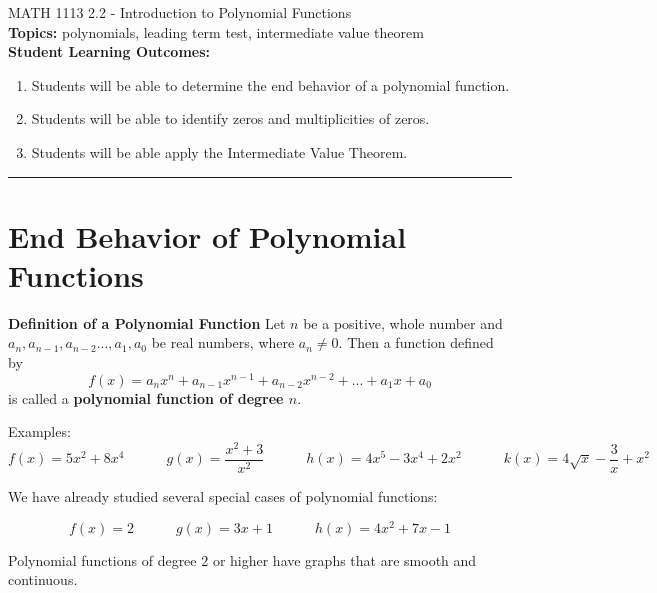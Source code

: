 \documentclass[11pt]{article}
\newcommand{\boxcolor}{gray!30}
\newenvironment{boxthm}{\begin{mdframed}[backgroundcolor=\boxcolor,nobreak=true]}{\end{mdframed}}
\begin{document}
\noindent MATH 1113   \hfill 2.2 - Introduction to Polynomial Functions\\



\noindent \textbf{Topics:}  polynomials, leading term test, intermediate value theorem\\

\noindent \textbf{Student Learning Outcomes:}
\begin{enumerate}
\item Students will be able to determine the end behavior of a polynomial function.
\item Students will be able to identify zeros and multiplicities of zeros.
\item Students will be able apply the Intermediate Value Theorem.

\end{enumerate}

\hrule 
\vspace{5mm}

\section{End Behavior of Polynomial Functions}

\begin{boxthm}
{\bf Definition of a Polynomial Function}
Let $n$ be a positive, whole number and $a_n,a_{n-1}, a_{n-2}...,a_1,a_0$ be real numbers, where $a_n\neq 0$.  Then a function defined by $$f(x)=a_nx^n+a_{n-1}x^{n-1}+a_{n-2}x^{n-2}+...+a_1x+a_0$$ is called a \textbf{polynomial function of degree $n$}.

\end{boxthm}


Examples:
$$f(x)=5x^2+8x^4 \quad \quad \quad g(x)=\frac{x^2+3}{x^2} \quad \quad \quad  h(x)=4x^5-3x^4+2x^2 \quad \quad \quad k(x)=4\sqrt{x}-\frac{3}{x} +x^2$$

\vfill
We have already studied several special cases of polynomial functions:

$$f(x)=2 \quad \quad \quad g(x)=3x+1 \quad \quad \quad  h(x)=4x^2+7x-1$$


\vfill

Polynomial functions of degree 2 or higher have graphs that are smooth and continuous.\\[.5in]


\newpage
\end{document}
